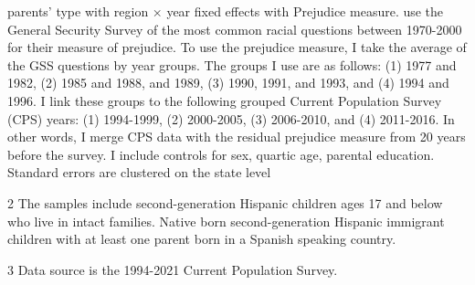 \begin{table}[H]
{\begin{threeparttable}
\begin{tablenotes}
{                      parents' type with region × year fixed effects with \citet{charlesPrejudiceWagesEmpirical2008} Prejudice measure. 
                      \citet{charlesPrejudiceWagesEmpirical2008} use the General Security Survey of the most common racial questions between 1970-2000 for their measure of prejudice.
                      To use the prejudice measure, I take the average of the GSS questions by year groups. The groups I use are as follows:
                      (1) 1977 and 1982, (2) 1985 and 1988, and 1989, (3) 1990, 1991, and 1993, and (4) 1994 and 1996. I link these groups to the following
                      grouped Current Population Survey (CPS) years: (1) 1994-1999, (2) 2000-2005, (3) 2006-2010, and (4) 2011-2016.
                      In other words, I merge CPS data with the residual prejudice  measure from 20 years before the survey.
                      I include controls for sex, quartic age, parental education.
                      Standard errors are clustered on the state level}
\item[2] \footnotesize{The samples include second-generation Hispanic children ages 17 and below who live in intact families. 
                      Native born second-generation Hispanic 
                      immigrant children with at least one parent born in a Spanish speaking 
                      country.}
\item[3] \footnotesize{Data source is the 1994-2021 Current Population Survey.}
\end{tablenotes}
\end{threeparttable}}
\end{table}
